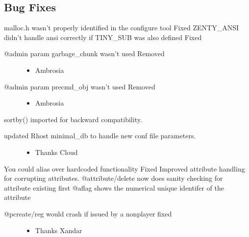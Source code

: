 \documentclass[letterpaper,10pt,english]{sphinxmanual}
\begin{document}
\subsection{Bug Fixes}
\label{\detokenize{changelog:id5}}
\sphinxAtStartPar
malloc.h wasn’t properly identified in the configure tool \sphinxhyphen{} Fixed
ZENTY\_ANSI didn’t handle ansi correctly if TINY\_SUB was also defined \sphinxhyphen{} Fixed
\begin{description}
\item[{@admin param garbage\_chunk wasn’t used \sphinxhyphen{} Removed}] \leavevmode\begin{itemize}
\item {} 
\sphinxAtStartPar
Ambrosia

\end{itemize}

\item[{@admin param precmd\_obj wasn’t used \sphinxhyphen{} Removed}] \leavevmode\begin{itemize}
\item {} 
\sphinxAtStartPar
Ambrosia

\end{itemize}

\end{description}

\sphinxAtStartPar
sortby() imported for backward compatibility.
\begin{description}
\item[{updated Rhost minimal\_db to handle new conf file parameters.}] \leavevmode\begin{itemize}
\item {} 
\sphinxAtStartPar
Thanks Cloud

\end{itemize}

\end{description}

\sphinxAtStartPar
You could alias over hardcoded functionality \sphinxhyphen{} Fixed
Improved attribute handling for corrupting attributes.
@attribute/delete now does sanity checking for attribute existing first
@aflag shows the numerical unique identifer of the attribute
\begin{description}
\item[{@pcreate/reg would crash if issued by a non\sphinxhyphen{}player \sphinxhyphen{} fixed}] \leavevmode\begin{itemize}
\item {} 
\sphinxAtStartPar
Thanks Xandar

\end{itemize}

\end{description}
\end{document}
